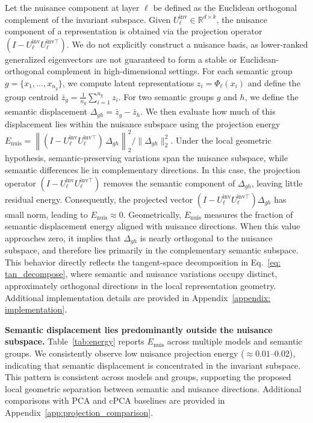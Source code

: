 Let the nuisance component at layer $\ell$ be defined as the Euclidean orthogonal complement of the invariant subspace. Given $U_\ell^{\mathrm{inv}} \in \mathbb{R}^{d \times k}$, the nuisance component of a representation is obtained via the projection operator $(I - U_\ell^{\mathrm{inv}} U_\ell^{\mathrm{inv}\top})$. We do not explicitly construct a nuisance basis, as lower-ranked generalized eigenvectors are not guaranteed to form a stable or Euclidean-orthogonal complement in high-dimensional settings. 
For each semantic group $g=\{x_1,\ldots,x_{n_g}\}$, we compute latent representations $z_i=\Phi_\ell(x_i)$ and define the group centroid $\bar{z}_g=\frac{1}{n_g}\sum_{i=1}^{n_g}z_i$. 
For two semantic groups $g$ and $h$, we define the semantic displacement
\(
\Delta_{gh} = \bar z_g - \bar z_h.
\)
We then evaluate how much of this displacement lies within the nuisance subspace using the projection energy
\(
E_{\mathrm{nuis}} =
\left\|(I - U_\ell^{\mathrm{inv}} U_\ell^{\mathrm{inv}\top}) \, \Delta_{gh}\right\|_2^2  / 
\|\Delta_{gh}\|_2^2.
\) 
Under the local geometric hypothesis, semantic-preserving variations span the nuisance subspace, while semantic differences lie in complementary directions. In this case, the projection operator $(I-U^{\mathrm{inv}}_\ell U^{\mathrm{inv}\top}_\ell)$ removes the semantic component of $\Delta_{gh}$, leaving little residual energy. Consequently, the projected vector $(I-U^{\mathrm{inv}}_\ell U^{\mathrm{inv}\top}_\ell)\Delta_{gh}$ has small norm, leading to $E_{\mathrm{nuis}} \approx 0$. 
Geometrically, $E_{\mathrm{nuis}}$ measures the fraction of semantic displacement energy aligned with nuisance directions. When this value approaches zero, it implies that $\Delta_{gh}$ is nearly orthogonal to the nuisance subspace, and therefore lies primarily in the complementary semantic subspace. This behavior directly reflects the tangent-space decomposition in Eq.~\ref{eq: tan_decompose}, where semantic and nuisance variations occupy distinct, approximately orthogonal directions in the local representation geometry. 
Additional implementation details are provided in Appendix~\ref{appendix: implementation}.

\textbf{Semantic displacement lies predominantly outside the nuisance subspace.}
Table~\ref{tab:energy} reports $E_{\mathrm{nuis}}$ across multiple models and semantic groups. We consistently observe low nuisance projection energy ($\approx 0.01$--$0.02$), indicating that semantic displacement is concentrated in the invariant subspace. This pattern is consistent across models and groups, supporting the proposed local geometric separation between semantic and nuisance directions. Additional comparisons with PCA and cPCA baselines are provided in Appendix~\ref{app:projection_comparison}.





